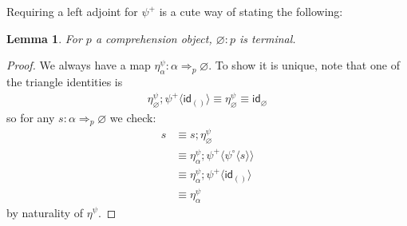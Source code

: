 \documentclass[10pt]{article}
\newtheorem{lemma}{Lemma}
\theoremstyle{definition}
\let\emptyset\varnothing
\newcommand{\tcell}{\Rightarrow}
\newcommand{\id}{\mathsf{id}}
\newcommand\ApPlus[2]{\ensuremath{{#1}^+ \langle #2 \rangle }}
\newcommand\ApCirc[2]{\ensuremath{{#1}^\circ \langle #2 \rangle }}
\begin{document}
Requiring a left adjoint for $\psi^+$ is a cute way of stating the following:
\begin{lemma}
For $p$ a comprehension object, $\emptyset : p$ is terminal.
\end{lemma}
\begin{proof}
We always have a map $\eta^\psi_\alpha : \alpha \tcell_p \emptyset$. To show it is unique, note that one of the triangle identities is 
\begin{align*}
\eta^\psi_\emptyset ; \ApPlus{\psi}{\id_{()}} \equiv \eta^\psi_\emptyset \equiv \id_\emptyset
\end{align*}
so for any $s : \alpha \tcell_p \emptyset$ we check:
\begin{align*}
s 
&\equiv s ; \eta^\psi_\emptyset \\
&\equiv \eta^\psi_\alpha ; \ApPlus{\psi}{\ApCirc{\psi}{s}} \\
&\equiv \eta^\psi_\alpha ; \ApPlus{\psi}{\id_{()}} \\
&\equiv \eta^\psi_\alpha
\end{align*}
by naturality of $\eta^\psi$.
\end{proof}
\end{document}
